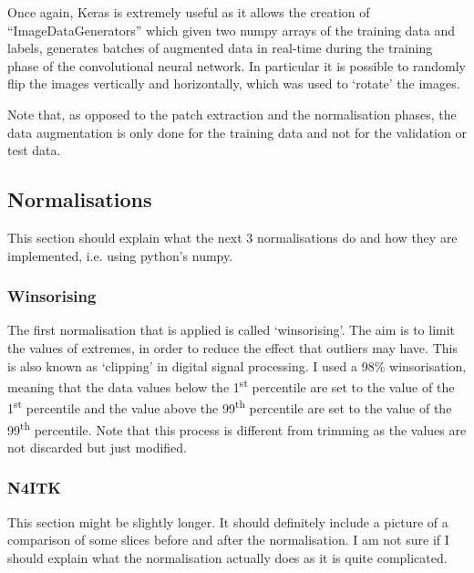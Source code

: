 \documentclass[12pt,a4paper,twoside,openright]{report}
\begin{document}
Once again, Keras is extremely useful as it allows the creation of ``ImageDataGenerators'' which given two numpy arrays of the training data and labels, generates batches of augmented data in real-time during the training phase of the convolutional neural network. In particular it is possible to randomly flip the images vertically and horizontally, which was used to `rotate' the images.

Note that, as opposed to the patch extraction and the normalisation phases, the data augmentation is only done for the training data and not for the validation or test data.

\subsection{Normalisations}
This section should explain what the next 3 normalisations do and how they are implemented, i.e. using python's numpy.
\subsubsection{Winsorising}
The first normalisation that is applied is called `winsorising'. The aim is to limit the values of extremes, in order to reduce the effect that outliers may have. This is also known as `clipping' in digital signal processing. I used a 98\% winsorisation, meaning that the data values below the 1\textsuperscript{st} percentile are set to the value of the 1\textsuperscript{st} percentile and the value above the 99\textsuperscript{th} percentile are set to the value of the 99\textsuperscript{th} percentile. Note that this process is different from trimming as the values are not discarded but just modified.
\subsubsection{N4ITK}
This section might be slightly longer. It should definitely include a picture of a comparison of some slices before and after the normalisation. I am not sure if I should explain what the normalisation actually does as it is quite complicated.
\end{document}
